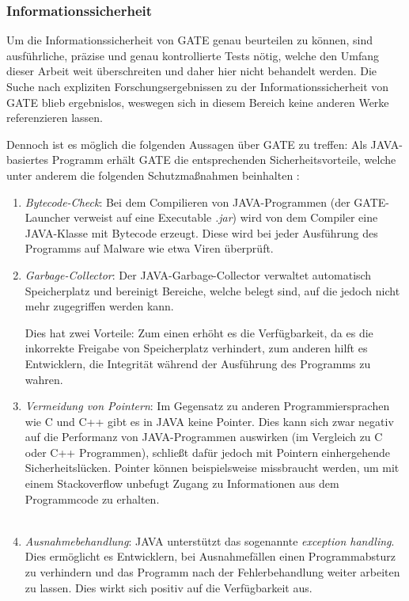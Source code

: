 \documentclass[12pt]{report}
\begin{document}
\subsubsection{Informationssicherheit}

Um die Informationssicherheit von GATE genau beurteilen zu können, sind ausführliche, präzise und genau kontrollierte Tests nötig, welche den Umfang dieser Arbeit weit überschreiten und daher hier nicht behandelt werden. Die Suche nach expliziten Forschungsergebnissen zu der Informationssicherheit von GATE blieb ergebnislos, weswegen sich in diesem Bereich keine anderen Werke referenzieren lassen.

Dennoch ist es möglich die folgenden Aussagen über GATE zu treffen:
Als JAVA-basiertes Programm erhält GATE die entsprechenden Sicherheitsvorteile, welche unter anderem die folgenden Schutzmaßnahmen beinhalten \cite{do18}:
\begin{enumerate}
\item \textit{Bytecode-Check}: Bei dem Compilieren von JAVA-Programmen (der GATE-Launcher verweist auf eine Executable \textit{.jar}) wird von dem Compiler eine JAVA-Klasse mit Bytecode erzeugt. Diese wird bei jeder Ausführung des Programms auf Malware wie etwa Viren überprüft. 
\item \textit{Garbage-Collector}: Der JAVA-Garbage-Collector verwaltet automatisch Speicherplatz und bereinigt Bereiche, welche belegt sind, auf die jedoch nicht mehr zugegriffen werden kann. 

Dies hat zwei Vorteile: Zum einen erhöht es die Verfügbarkeit, da es die inkorrekte Freigabe von Speicherplatz verhindert, zum anderen hilft es Entwicklern, die Integrität während der Ausführung des Programms zu wahren. 
\item \textit{Vermeidung von Pointern}: Im Gegensatz zu anderen Programmiersprachen wie C und C++ gibt es in JAVA keine Pointer. Dies kann sich zwar negativ auf die Performanz von JAVA-Programmen auswirken (im Vergleich zu C oder C++ Programmen), schließt dafür jedoch mit Pointern einhergehende Sicherheitslücken. Pointer können beispielsweise missbraucht werden, um mit einem \glqq Stackoverflow\grqq{} unbefugt Zugang zu Informationen aus dem Programmcode zu erhalten. 
\\
\\
\item \textit{Ausnahmebehandlung}: JAVA unterstützt das sogenannte \textit{exception handling}. Dies ermöglicht es Entwicklern, bei Ausnahmefällen einen Programmabsturz zu verhindern und das Programm nach der Fehlerbehandlung weiter arbeiten zu lassen. Dies wirkt sich positiv auf die Verfügbarkeit aus.
\end{enumerate}
\end{document}
